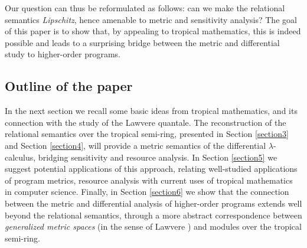 Our question can thus be reformulated as follows: can we make the relational semantics \emph{Lipschitz}, hence amenable to metric and sensitivity analysis? The goal of this paper is to show that, by appealing to tropical mathematics, this is indeed possible and leads to a surprising 
bridge between the metric and differential study to higher-order programs.
%


\subsection{Outline of the paper}

In the next section we recall some basic ideas from tropical mathematics, and its connection with the study of the Lawvere quantale.
The reconstruction of the relational semantics over the tropical semi-ring, presented in Section \ref{section3} and Section \ref{section4}, will provide a metric semantics of the differential $\lambda$-calculus, bridging sensitivity and resource analysis. 
In Section \ref{section5} we suggest potential applications of this approach, relating well-studied applications of program metrics, resource analysis with current uses of tropical mathematics in computer science.  
Finally, in Section \ref{section6} we show that the connection between the metric and differential analysis of higher-order programs extends well beyond the relational semantics, through a more abstract correspondence between  
\emph{generalized metric spaces} (in the sense of Lawvere \cite{}) and modules over the tropical semi-ring.


